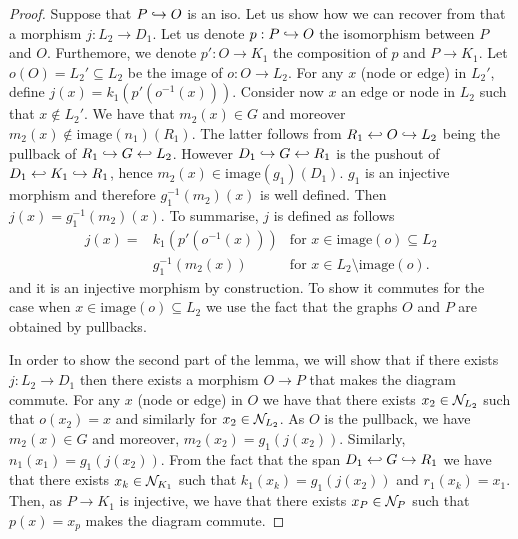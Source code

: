\begin{proof}
    Suppose that $P\hookrightarrow O$ is an iso. Let us show how we can recover from that a morphism $j:L_2\to D_1$.
    Let us denote $p:P\hookrightarrow O$ the isomorphism between $P$ and $O$. Furthemore, we denote $p':O\to K_1$ the composition of $p$ and $P\to K_1$.
    Let $o(O) =L_2'\subseteq L_2$ be the image of $o:O\to L_2$. For any $x$ (node or edge) in $L_2'$, define $j(x) = k_1(p'(o^{-1}(x)))$. Consider now $x$ an edge or node in $L_2$ such that $x\notin L_2'$. We have that $m_2(x)\in G$ and moreover $m_2(x)\notin\text{image}(n_1)(R_1)$. The latter follows from $R_1 \hookleftarrow O\hookrightarrow L_2$ being the pullback of $R_1\hookrightarrow G\hookleftarrow L_2$. However $D_1\hookrightarrow G\hookleftarrow R_1$ is the pushout of $D_1\hookleftarrow K_1\hookrightarrow R_1$, hence $m_2(x)\in\text{image}(g_1)(D_1)$. $g_1$ is an injective morphism and therefore $g_1^{-1}(m_2)(x)$ is well defined. Then $j(x) = g_1^{-1}(m_2)(x)$. To summarise, $j$ is defined as follows
    \begin{align*}
      j(x) =& k_1(p'(o^{-1}(x))) &\text{for }x\in\text{image}(o)\subseteq L_2\\
      & g_1^{-1}(m_2(x))&\text{for }x\in L_2\setminus\text{image}(o).
    \end{align*}
and it is an injective morphism by construction. To show it commutes for the case when $x\in\text{image}(o)\subseteq L_2$ we use the fact that the graphs $O$ and $P$ are obtained by pullbacks.

In order to show the second part of the lemma, we will show that if there exists $j:L_2\to D_1$ then there exists a morphism $O\to P$ that makes the diagram commute. For any $x$ (node or edge) in $O$ we have that there exists $x_2\in\mathcal{N}_{L_2}$ such that $o(x_2)=x$ and similarly for $x_2\in\mathcal{N}_{L_2}$. As $O$ is the pullback, we have $m_2(x)\in G$ and moreover, $m_2(x_2)=g_1(j(x_2))$. Similarly, $n_1(x_1)=g_1(j(x_2))$. From the fact that the span $D_1\hookleftarrow G\hookrightarrow R_1$ we have that there exists $x_k\in \mathcal{N}_{K_1}$ such that $k_1(x_k) = g_1(j(x_2))$ and $r_1(x_k)=x_1$. Then, as $P\to K_1$ is injective, we have that there exists $x_P\in\mathcal{N}_P$ such that $p(x)=x_p$ makes the diagram commute.
\end{proof}

